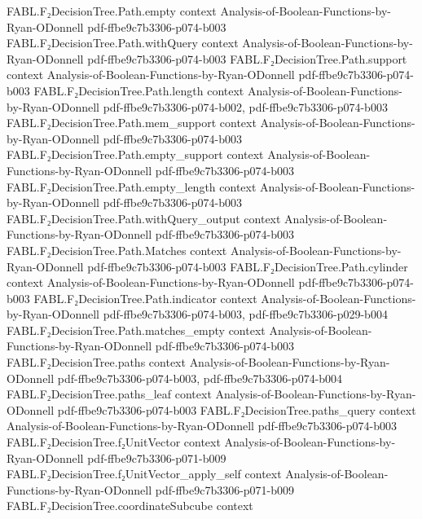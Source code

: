 \begin{theorem}
\proofstep
  {FABL.F₂DecisionTree.Path.empty}
  {context}
  {Analysis-of-Boolean-Functions-by-Ryan-ODonnell}
  {pdf-ffbe9c7b3306-p074-b003}
\proofstep
  {FABL.F₂DecisionTree.Path.withQuery}
  {context}
  {Analysis-of-Boolean-Functions-by-Ryan-ODonnell}
  {pdf-ffbe9c7b3306-p074-b003}
\proofstep
  {FABL.F₂DecisionTree.Path.support}
  {context}
  {Analysis-of-Boolean-Functions-by-Ryan-ODonnell}
  {pdf-ffbe9c7b3306-p074-b003}
\proofstep
  {FABL.F₂DecisionTree.Path.length}
  {context}
  {Analysis-of-Boolean-Functions-by-Ryan-ODonnell}
  {pdf-ffbe9c7b3306-p074-b002,
    pdf-ffbe9c7b3306-p074-b003}
\proofstep
  {FABL.F₂DecisionTree.Path.mem_support}
  {context}
  {Analysis-of-Boolean-Functions-by-Ryan-ODonnell}
  {pdf-ffbe9c7b3306-p074-b003}
\proofstep
  {FABL.F₂DecisionTree.Path.empty_support}
  {context}
  {Analysis-of-Boolean-Functions-by-Ryan-ODonnell}
  {pdf-ffbe9c7b3306-p074-b003}
\proofstep
  {FABL.F₂DecisionTree.Path.empty_length}
  {context}
  {Analysis-of-Boolean-Functions-by-Ryan-ODonnell}
  {pdf-ffbe9c7b3306-p074-b003}
\proofstep
  {FABL.F₂DecisionTree.Path.withQuery_output}
  {context}
  {Analysis-of-Boolean-Functions-by-Ryan-ODonnell}
  {pdf-ffbe9c7b3306-p074-b003}
\proofstep
  {FABL.F₂DecisionTree.Path.Matches}
  {context}
  {Analysis-of-Boolean-Functions-by-Ryan-ODonnell}
  {pdf-ffbe9c7b3306-p074-b003}
\proofstep
  {FABL.F₂DecisionTree.Path.cylinder}
  {context}
  {Analysis-of-Boolean-Functions-by-Ryan-ODonnell}
  {pdf-ffbe9c7b3306-p074-b003}
\proofstep
  {FABL.F₂DecisionTree.Path.indicator}
  {context}
  {Analysis-of-Boolean-Functions-by-Ryan-ODonnell}
  {pdf-ffbe9c7b3306-p074-b003,
    pdf-ffbe9c7b3306-p029-b004}
\proofstep
  {FABL.F₂DecisionTree.Path.matches_empty}
  {context}
  {Analysis-of-Boolean-Functions-by-Ryan-ODonnell}
  {pdf-ffbe9c7b3306-p074-b003}
\proofstep
  {FABL.F₂DecisionTree.paths}
  {context}
  {Analysis-of-Boolean-Functions-by-Ryan-ODonnell}
  {pdf-ffbe9c7b3306-p074-b003,
    pdf-ffbe9c7b3306-p074-b004}
\proofstep
  {FABL.F₂DecisionTree.paths_leaf}
  {context}
  {Analysis-of-Boolean-Functions-by-Ryan-ODonnell}
  {pdf-ffbe9c7b3306-p074-b003}
\proofstep
  {FABL.F₂DecisionTree.paths_query}
  {context}
  {Analysis-of-Boolean-Functions-by-Ryan-ODonnell}
  {pdf-ffbe9c7b3306-p074-b003}
\proofstep
  {FABL.F₂DecisionTree.f₂UnitVector}
  {context}
  {Analysis-of-Boolean-Functions-by-Ryan-ODonnell}
  {pdf-ffbe9c7b3306-p071-b009}
\proofstep
  {FABL.F₂DecisionTree.f₂UnitVector_apply_self}
  {context}
  {Analysis-of-Boolean-Functions-by-Ryan-ODonnell}
  {pdf-ffbe9c7b3306-p071-b009}
\proofstep
  {FABL.F₂DecisionTree.coordinateSubcube}
  {context}

\end{theorem}
